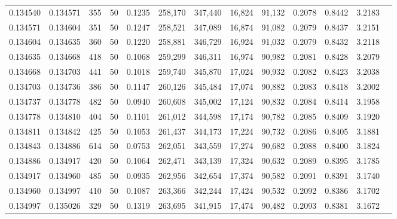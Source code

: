 \begin{tabular}{rrrrrrrrrrrrr}
0.134540 & 0.134571 &   355 &  50 &                                     0.1235 & 258,170 & 347,440 &  16,824 &  91,132 & 0.2078 & 0.8442 & 3.2183 \\
0.134571 & 0.134604 &   351 &  50 &                                     0.1247 & 258,521 & 347,089 &  16,874 &  91,082 & 0.2079 & 0.8437 & 3.2151 \\
0.134604 & 0.134635 &   360 &  50 &                                     0.1220 & 258,881 & 346,729 &  16,924 &  91,032 & 0.2079 & 0.8432 & 3.2118 \\
0.134635 & 0.134668 &   418 &  50 &                                     0.1068 & 259,299 & 346,311 &  16,974 &  90,982 & 0.2081 & 0.8428 & 3.2079 \\
0.134668 & 0.134703 &   441 &  50 &                                     0.1018 & 259,740 & 345,870 &  17,024 &  90,932 & 0.2082 & 0.8423 & 3.2038 \\
0.134703 & 0.134736 &   386 &  50 &                                     0.1147 & 260,126 & 345,484 &  17,074 &  90,882 & 0.2083 & 0.8418 & 3.2002 \\
0.134737 & 0.134778 &   482 &  50 &                                     0.0940 & 260,608 & 345,002 &  17,124 &  90,832 & 0.2084 & 0.8414 & 3.1958 \\
0.134778 & 0.134810 &   404 &  50 &                                     0.1101 & 261,012 & 344,598 &  17,174 &  90,782 & 0.2085 & 0.8409 & 3.1920 \\
0.134811 & 0.134842 &   425 &  50 &                                     0.1053 & 261,437 & 344,173 &  17,224 &  90,732 & 0.2086 & 0.8405 & 3.1881 \\
0.134843 & 0.134886 &   614 &  50 &                                     0.0753 & 262,051 & 343,559 &  17,274 &  90,682 & 0.2088 & 0.8400 & 3.1824 \\
0.134886 & 0.134917 &   420 &  50 &                                     0.1064 & 262,471 & 343,139 &  17,324 &  90,632 & 0.2089 & 0.8395 & 3.1785 \\
0.134917 & 0.134960 &   485 &  50 &                                     0.0935 & 262,956 & 342,654 &  17,374 &  90,582 & 0.2091 & 0.8391 & 3.1740 \\
0.134960 & 0.134997 &   410 &  50 &                                     0.1087 & 263,366 & 342,244 &  17,424 &  90,532 & 0.2092 & 0.8386 & 3.1702 \\
0.134997 & 0.135026 &   329 &  50 &                                     0.1319 & 263,695 & 341,915 &  17,474 &  90,482 & 0.2093 & 0.8381 & 3.1672 \\

\end{tabular}
